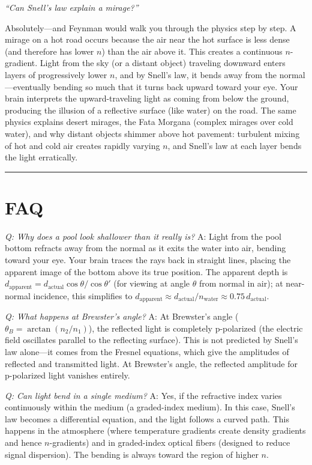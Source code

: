 \textit{``Can Snell's law explain a mirage?''}

Absolutely---and Feynman would walk you through the physics step by step. A mirage on a hot road occurs because the air near the hot surface is less dense (and therefore has lower $n$) than the air above it. This creates a continuous $n$-gradient. Light from the sky (or a distant object) traveling downward enters layers of progressively lower $n$, and by Snell's law, it bends away from the normal---eventually bending so much that it turns back upward toward your eye. Your brain interprets the upward-traveling light as coming from below the ground, producing the illusion of a reflective surface (like water) on the road. The same physics explains desert mirages, the Fata Morgana (complex mirages over cold water), and why distant objects shimmer above hot pavement: turbulent mixing of hot and cold air creates rapidly varying $n$, and Snell's law at each layer bends the light erratically.

\bigskip
\hrule
\bigskip
\section*{FAQ}

\textit{Q: Why does a pool look shallower than it really is?}
A: Light from the pool bottom refracts away from the normal as it exits the water into air, bending toward your eye. Your brain traces the rays back in straight lines, placing the apparent image of the bottom above its true position. The apparent depth is $d_{\text{apparent}} = d_{\text{actual}}\cos\theta/\cos\theta'$ (for viewing at angle $\theta$ from normal in air); at near-normal incidence, this simplifies to $d_{\text{apparent}} \approx d_{\text{actual}}/n_{\text{water}} \approx 0.75\,d_{\text{actual}}$.

\textit{Q: What happens at Brewster's angle?}
A: At Brewster's angle ($\theta_B = \arctan(n_2/n_1)$), the reflected light is completely p-polarized (the electric field oscillates parallel to the reflecting surface). This is not predicted by Snell's law alone---it comes from the Fresnel equations, which give the amplitudes of reflected and transmitted light. At Brewster's angle, the reflected amplitude for p-polarized light vanishes entirely.

\textit{Q: Can light bend in a single medium?}
A: Yes, if the refractive index varies continuously within the medium (a graded-index medium). In this case, Snell's law becomes a differential equation, and the light follows a curved path. This happens in the atmosphere (where temperature gradients create density gradients and hence $n$-gradients) and in graded-index optical fibers (designed to reduce signal dispersion). The bending is always toward the region of higher $n$.
